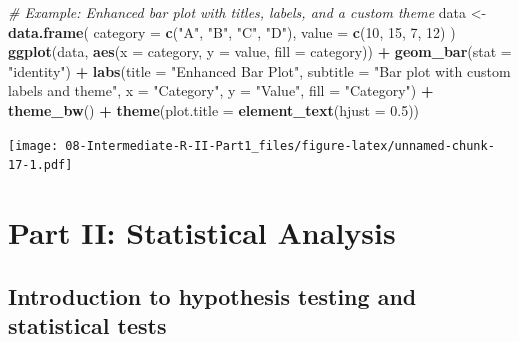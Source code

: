 \documentclass[
]{book}
\newenvironment{Shaded}{\begin{snugshade}}{\end{snugshade}}
\newcommand{\AttributeTok}[1]{\textcolor[rgb]{0.13,0.29,0.53}{#1}}
\newcommand{\CommentTok}[1]{\textcolor[rgb]{0.56,0.35,0.01}{\textit{#1}}}
\newcommand{\DecValTok}[1]{\textcolor[rgb]{0.00,0.00,0.81}{#1}}
\newcommand{\FloatTok}[1]{\textcolor[rgb]{0.00,0.00,0.81}{#1}}
\newcommand{\FunctionTok}[1]{\textcolor[rgb]{0.13,0.29,0.53}{\textbf{#1}}}
\newcommand{\NormalTok}[1]{#1}
\newcommand{\OtherTok}[1]{\textcolor[rgb]{0.56,0.35,0.01}{#1}}
\newcommand{\SpecialCharTok}[1]{\textcolor[rgb]{0.81,0.36,0.00}{\textbf{#1}}}
\newcommand{\StringTok}[1]{\textcolor[rgb]{0.31,0.60,0.02}{#1}}
\begin{document}
\begin{Shaded}
\begin{Highlighting}[]
\CommentTok{\# Example: Enhanced bar plot with titles, labels, and a custom theme}
\NormalTok{data }\OtherTok{\textless{}{-}} \FunctionTok{data.frame}\NormalTok{(}
  \AttributeTok{category =} \FunctionTok{c}\NormalTok{(}\StringTok{"A"}\NormalTok{, }\StringTok{"B"}\NormalTok{, }\StringTok{"C"}\NormalTok{, }\StringTok{"D"}\NormalTok{),}
  \AttributeTok{value =} \FunctionTok{c}\NormalTok{(}\DecValTok{10}\NormalTok{, }\DecValTok{15}\NormalTok{, }\DecValTok{7}\NormalTok{, }\DecValTok{12}\NormalTok{)}
\NormalTok{)}
\FunctionTok{ggplot}\NormalTok{(data, }\FunctionTok{aes}\NormalTok{(}\AttributeTok{x =}\NormalTok{ category, }\AttributeTok{y =}\NormalTok{ value, }\AttributeTok{fill =}\NormalTok{ category)) }\SpecialCharTok{+}
  \FunctionTok{geom\_bar}\NormalTok{(}\AttributeTok{stat =} \StringTok{"identity"}\NormalTok{) }\SpecialCharTok{+}
  \FunctionTok{labs}\NormalTok{(}\AttributeTok{title =} \StringTok{"Enhanced Bar Plot"}\NormalTok{,}
       \AttributeTok{subtitle =} \StringTok{"Bar plot with custom labels and theme"}\NormalTok{,}
       \AttributeTok{x =} \StringTok{"Category"}\NormalTok{,}
       \AttributeTok{y =} \StringTok{"Value"}\NormalTok{,}
       \AttributeTok{fill =} \StringTok{"Category"}\NormalTok{) }\SpecialCharTok{+}
  \FunctionTok{theme\_bw}\NormalTok{() }\SpecialCharTok{+}
  \FunctionTok{theme}\NormalTok{(}\AttributeTok{plot.title =} \FunctionTok{element\_text}\NormalTok{(}\AttributeTok{hjust =} \FloatTok{0.5}\NormalTok{))}
\end{Highlighting}
\end{Shaded}

\texttt{[image: 08-Intermediate-R-II-Part1\_files/figure-latex/unnamed-chunk-17-1.pdf]}

\chapter*{Part II: Statistical Analysis}\label{part-ii-statistical-analysis}

\section*{Introduction to hypothesis testing and statistical tests}\label{introduction-to-hypothesis-testing-and-statistical-tests}
\end{document}
